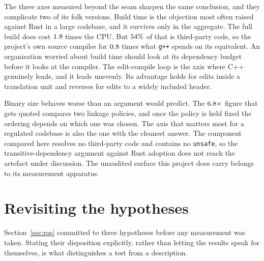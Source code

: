 \documentclass[english,oneside,a4paper,censored,csm,software-track-2020]{HYthesisML}
\begin{document}
The three axes measured beyond the seam sharpen the same conclusion, and they complicate two of its
folk versions. Build time is the objection most often raised against Rust in a large codebase, and
it survives only in the aggregate. The full build does cost $1.8$ times the CPU. But
$54\%$ of that is third-party code, so the project's own source compiles for
$0.8$ times what \texttt{g++} spends on its equivalent. An organisation
worried about build time should look at its dependency budget before it looks at the
compiler. The edit-compile loop is the axis where C++ genuinely leads, and it leads unevenly. Its
advantage holds for edits inside a translation unit and reverses for edits to a widely included
header.

Binary size behaves worse than an argument would predict. The $6.8\times$
figure that gets quoted compares two linkage policies, and once the policy is held fixed
the ordering depends on which one was chosen. The axis that matters most for a regulated codebase
is also the one with the cleanest answer. The component compared here resolves no third-party code
and contains no \texttt{unsafe}, so the transitive-dependency argument against Rust adoption does
not reach the artefact under discussion. The unaudited surface this project does carry belongs to
its measurement apparatus.

\section{Revisiting the hypotheses}\label{sec:hypotheses}
Section~\ref{sec:rqs} committed to three hypotheses before any measurement was
taken. Stating their disposition explicitly, rather than letting the results speak for
themselves, is what distinguishes a test from a description.
\end{document}
